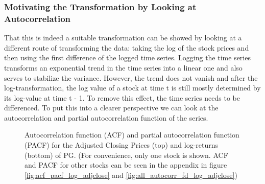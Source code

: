 \subsubsection{Motivating the Transformation by Looking at Autocorrelation}
That this is indeed a suitable transformation can be showed by looking at a different route of transforming the data: taking the log of the stock prices and then using the first difference of the logged time series. Logging the time series transforms an exponential trend in the time series into a linear one and also serves to stabilize the variance. However, the trend does not vanish and after the log-transformation, the log value of a stock at time t is still mostly determined by its log-value at time t - 1. To remove this effect, the time series needs to be differenced. To put this into a clearer perspective we can look at the autocorrelation and partial autocorrelation function of the series. 

\begin{figure}[h!]
    \centering
    \begin{adjustbox}{width=.95\textwidth,center}
    
    \end{adjustbox}  
    \hspace{3ex}
    \begin{adjustbox}{width=.95\textwidth,center}
    
    \end{adjustbox}
    \caption{Autocorrelation function (ACF) and partial autocorrelation function (PACF) for the Adjusted Closing Prices (top) and log-returns (bottom) of PG. (For convenience, only one stock is shown. ACF and PACF for other stocks can be seen in the appendix in figure \ref{fig:acf_pacf_log_adjclose} and  \ref{fig:all_autocorr_fd_log_adjclose})}
    \label{fig:acf_pacf_log_adjclose_PG}
\end{figure}{}

